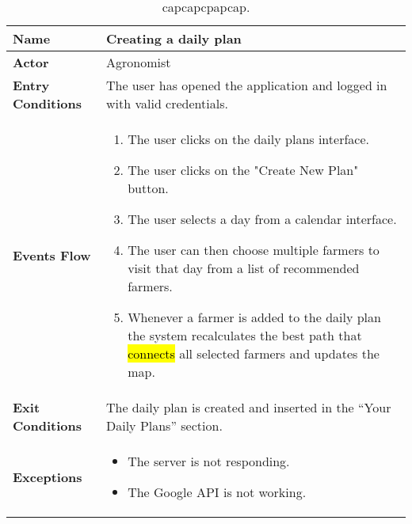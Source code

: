 
\begin{table}[hbt!]
\centering
\caption{\label{tab:addOne{table_counter}}capcapcpapcap.}
\renewcommand{\arraystretch}{1.25}
\begin{tabular}{|l|>{\raggedright\arraybackslash}m{12cm}|}
    \hline
    \textbf{Name} & Creating a daily plan\\
    \hline
   	\textbf{Actor} & Agronomist\\
    \hline
    \textbf{Entry Conditions} & The user has opened the application and logged in with valid credentials.\\    
    \hline
    \textbf{Events Flow} & \begin{enumerate}
            \item The user clicks on the daily plans interface.
            \item The user clicks on the "Create New Plan" button.
            \item The user selects a day from a calendar interface.
            \item The user can then choose multiple farmers to visit that day from a list of recommended farmers.
            \item Whenever a farmer is added to the daily plan the system recalculates the best path that \hl{connects} all selected farmers and updates the map.
       \end{enumerate} \\
    \hline
    \textbf{Exit Conditions} & The daily plan is created and inserted in the “Your Daily Plans” section.\\
    \hline
    \textbf{Exceptions} &
      \begin{itemize}
          \item The server is not responding.%
          \item The Google API is not working.%
        \end{itemize}
 \\
    \hline
\end{tabular}
\end{table}